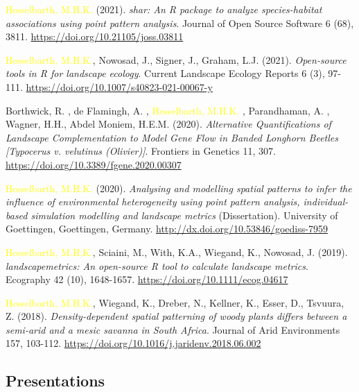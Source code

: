 \documentclass[hidelinks]{report}
\begin{document}
\begin{hangparas}{7.5mm}{1}
\textcolor{yellow}{Hesselbarth, M.H.K.} (2021). \textit{shar: An R package to analyze species-habitat associations using point pattern analysis}. Journal of Open Source Software 6 (68), 3811. \url{https://doi.org/10.21105/joss.03811}

\textcolor{yellow}{Hesselbarth, M.H.K.}, Nowosad, J., Signer, J., Graham, L.J. (2021). \textit{Open-source tools in R for landscape ecology}. Current Landscape Ecology Reports 6 (3), 97-111. \url{https://doi.org/10.1007/s40823-021-00067-y}

Borthwick, R. \textcolor{grey}{\Cross}, de Flamingh, A. \textcolor{grey}{\Cross}, \textcolor{yellow}{Hesselbarth, M.H.K.} \textcolor{grey}{\Cross}, Parandhaman, A. \textcolor{grey}{\Cross}, Wagner, H.H., Abdel Moniem, H.E.M. (2020). \textit{Alternative Quantifications of Landscape Complementation to Model Gene Flow in Banded Longhorn Beetles [Typocerus v. velutinus (Olivier)]}. Frontiers in Genetics 11, 307. \url{https://doi.org/10.3389/fgene.2020.00307}

\textcolor{yellow}{Hesselbarth, M.H.K.} (2020). \textit{Analysing and modelling spatial patterns to infer the influence of environmental heterogeneity using point pattern analysis, individual-based simulation modelling and landscape metrics} (Dissertation). University of Goettingen, Goettingen, Germany. \url{http://dx.doi.org/10.53846/goediss-7959}

\textcolor{yellow}{Hesselbarth, M.H.K.}, Sciaini, M., With, K.A., Wiegand, K., Nowosad, J. (2019). \textit{landscapemetrics: An open-source R tool to calculate landscape metrics}. Ecography 42 (10), 1648-1657. \url{https://doi.org/10.1111/ecog.04617}

\textcolor{yellow}{Hesselbarth, M.H.K.}, Wiegand, K., Dreber, N., Kellner, K., Esser, D., Tsvuura, Z. (2018). \textit{Density-dependent spatial patterning of woody plants differs between a semi-arid and a mesic savanna in South Africa}. Journal of Arid Environments 157, 103-112. \url{https://doi.org/10.1016/j.jaridenv.2018.06.002}

\end{hangparas}

\subsection*{Presentations}
\end{document}
